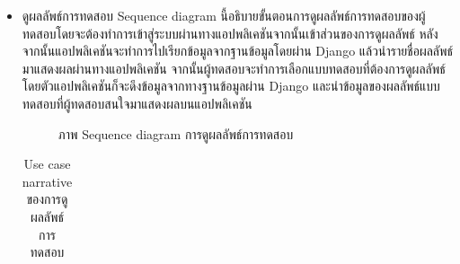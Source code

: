 \documentclass[12pt,oneside,openright,a4paper]{cpe-thai-project}
\begin{document}
\begin{itemize}
\begin{table}[!h]
\begin{tabular}{|p{4cm}|p{10cm}|}
      \end{tabular}
      \end{table}
    \newpage
    \item ดูผลลัพธ์การทดสอบ
    Sequence diagram นี้อธิบายขั้นตอนการดูผลลัพธ์การทดสอบของผู้ทดสอบโดยจะต้องทำการเข้าสู่ระบบผ่านทางแอปพลิเคชันจากนั้นเข้าส่วนของการดูผลลัพธ์ หลังจากนั้นแอปพลิเคชันจะทำการไปเรียกข้อมูลจากฐานข้อมูลโดยผ่าน Django แล้วนำรายชื่อผลลัพธ์มาแสดงผลผ่านทางแอปพลิเคชัน จากนั้นผู้ทดสอบจะทำการเลือกแบบทดสอบที่ต้องการดูผลลัพธ์ โดยตัวแอปพลิเคชันก็จะดึงข้อมูลจากทางฐานข้อมูลผ่าน Django และนำข้อมูลของผลลัพธ์แบบทดสอบที่ผู้ทดสอบสนใจมาแสดงผลบนแอปพลิเคชัน
    \begin{figure}[!ht]\centering
      \setlength{\fboxrule}{0.2mm} %
      \setlength{\fboxsep}{1cm}
      \caption{ภาพ Sequence diagram การดูผลลัพธ์การทดสอบ}\label{fig:activity2}
     \end{figure}
     \newpage
     \begin{table}[!h]\centering
      \caption{Use case narrative ของการดูผลลัพธ์การทดสอบ}\label{tbl:application1}
      \begin{tabular}{|p{4cm}|p{10cm}|} \hline

\end{tabular}
\end{table}
\end{itemize}
\end{document}
